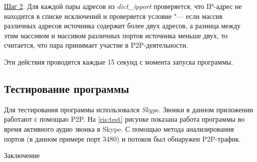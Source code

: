 \documentclass[bachelor, och, coursework]{SCWorks}
\begin{document}
\underline{Шаг 2}. Для каждой пары адресов из \textit{dict_ipport} проверяется, что IP-адрес не находится в списке исключений и проверяется
условие "--- если массив различных адресов источника содержит более двух адресов, а разница между этим массивом и массивом различных портов
источника меньше двух, то считается, что пара принимает участие в P2P-деятельности.

Эти действия проводятся каждые 15 секунд с момента запуска программы.

\subsection{Тестирование программы}
Для тестирования программы использовался \textit{Skype}. Звонки в данном приложении работают с помощью P2P. 
На \ref{ris:test} рисунке показана работа программы во время активного аудио звонка в Skype. С помощью метода анализирования 
портов (в данном примере порт 3480) и потоков был обнаружен P2P-трафик.

\conclusion
Заключение



\end{document}

